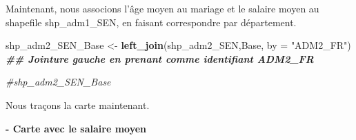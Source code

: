 \documentclass[
]{article}
\newenvironment{Shaded}{\begin{snugshade}}{\end{snugshade}}
\newcommand{\AttributeTok}[1]{\textcolor[rgb]{0.13,0.29,0.53}{#1}}
\newcommand{\CommentTok}[1]{\textcolor[rgb]{0.56,0.35,0.01}{\textit{#1}}}
\newcommand{\DocumentationTok}[1]{\textcolor[rgb]{0.56,0.35,0.01}{\textbf{\textit{#1}}}}
\newcommand{\FunctionTok}[1]{\textcolor[rgb]{0.13,0.29,0.53}{\textbf{#1}}}
\newcommand{\NormalTok}[1]{#1}
\newcommand{\OtherTok}[1]{\textcolor[rgb]{0.56,0.35,0.01}{#1}}
\newcommand{\StringTok}[1]{\textcolor[rgb]{0.31,0.60,0.02}{#1}}
\begin{document}
Maintenant, nous associons l'âge moyen au mariage et le salaire moyen au
shapefile shp\_adm1\_SEN, en faisant correspondre par département.

\begin{Shaded}
\begin{Highlighting}[]
\NormalTok{shp\_adm2\_SEN\_Base }\OtherTok{\textless{}{-}} \FunctionTok{left\_join}\NormalTok{(shp\_adm2\_SEN,Base, }\AttributeTok{by =} \StringTok{"ADM2\_FR"}\NormalTok{) }\DocumentationTok{\#\# Jointure gauche en prenant comme identifiant ADM2\_FR}

\CommentTok{\#shp\_adm2\_SEN\_Base}
\end{Highlighting}
\end{Shaded}

Nous traçons la carte maintenant.

\textbf{- Carte avec le salaire moyen}
\end{document}
